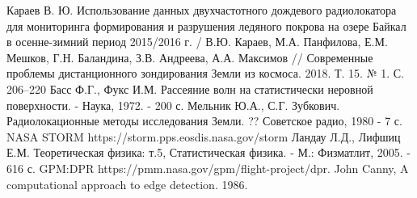 \newpage
{}
\begin{thebibliography}{99}
 Караев В. Ю. Использование данных двухчастотного дождевого радиолокатора для мониторинга формирования
и разрушения ледяного покрова на озере Байкал в осенне-зимний период 2015/2016 г. / В.Ю. Караев, М.А. Панфилова, Е.М.
Мешков, Г.Н. Баландина, З.В. Андреева, А.А. Максимов // Современные проблемы дистанционного зондирования Земли из
космоса. 2018. Т. 15. № 1. С. 206–220
 Басс Ф.Г., Фукс И.М. Рассеяние волн на статистически неровной поверхности. - Наука, 1972. - 200 с.
 Мельник Ю.А., С.Г. Зубкович. Радиолокационные методы исследования Земли. ?? Советское радио, 1980 - 7 с.
 NASA STORM https://storm.pps.eosdis.nasa.gov/storm
 Ландау Л.Д., Лифшиц Е.М. Теоретическая физика: т.5, Статистическая физика. - М.: Физматлит, 2005. - 616 с.
 GPM:DPR https://pmm.nasa.gov/gpm/flight-project/dpr.
 John Canny, A computational approach to edge detection. 1986.
\end{thebibliography}

